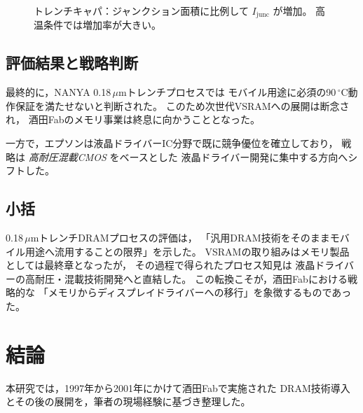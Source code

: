 \documentclass[conference]{IEEEtran}
\begin{document}
\begin{figure}[t]
\centering
{}
\caption{トレンチキャパ：ジャンクション面積に比例して $I_{\mathrm{junc}}$ が増加。
高温条件では増加率が大きい。}
\label{fig:trench_area_leak}
\end{figure}

\subsection{評価結果と戦略判断}
最終的に，NANYA 0.18\,$\mu$mトレンチプロセスでは
モバイル用途に必須の90\,$^\circ$C動作保証を満たせないと判断された。
このため次世代VSRAMへの展開は断念され，
酒田Fabのメモリ事業は終息に向かうこととなった。

一方で，エプソンは液晶ドライバーIC分野で既に競争優位を確立しており，
戦略は \emph{高耐圧混載CMOS} をベースとした
液晶ドライバー開発に集中する方向へシフトした。

\subsection{小括}
0.18\,$\mu$mトレンチDRAMプロセスの評価は，
「汎用DRAM技術をそのままモバイル用途へ流用することの限界」を示した。
VSRAMの取り組みはメモリ製品としては最終章となったが，
その過程で得られたプロセス知見は
液晶ドライバーの高耐圧・混載技術開発へと直結した。
この転換こそが，酒田Fabにおける戦略的な
「メモリからディスプレイドライバーへの移行」を象徴するものであった。

\section{結論}

本研究では，1997年から2001年にかけて酒田Fabで実施された
DRAM技術導入とその後の展開を，筆者の現場経験に基づき整理した。
\end{document}

